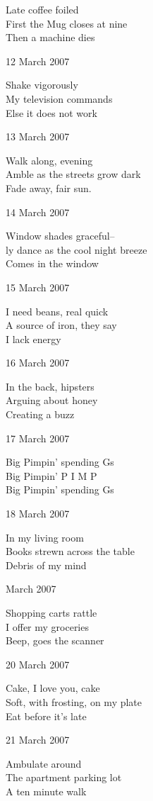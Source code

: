 \documentclass[12pt]{article}
\begin{document}
Late coffee foiled \\
First the Mug closes at nine \\
Then a machine dies

\newpage

12 March 2007

Shake vigorously \\
My television commands \\
Else it does not work

13 March 2007

Walk along, evening \\
Amble as the streets grow dark \\
Fade away, fair sun.

14 March 2007

Window shades graceful-- \\
ly dance as the cool night breeze \\
Comes in the window

15 March 2007

I need beans, real quick \\
A source of iron, they say \\
I lack energy

16 March 2007

In the back, hipsters \\
Arguing about honey \\
Creating a buzz

17 March 2007

Big Pimpin' spending Gs \\
Big Pimpin' P I M P \\
Big Pimpin' spending Gs

18 March 2007

In my living room \\
Books strewn across the table \\
Debris of my mind


 March 2007

Shopping carts rattle \\
I offer my groceries \\
Beep, goes the scanner

20 March 2007

Cake, I love you, cake \\
Soft, with frosting, on my plate \\
Eat before it's late

21 March 2007

Ambulate around \\
The apartment parking lot \\
A ten minute walk
\end{document}
